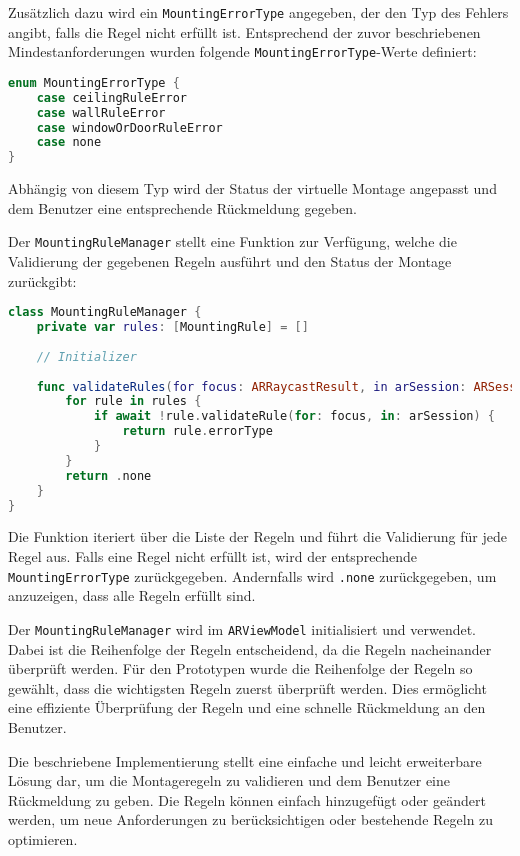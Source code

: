 Zusätzlich dazu wird ein \texttt{MountingErrorType} angegeben, der den Typ des Fehlers angibt, falls die Regel nicht erfüllt ist. Entsprechend der zuvor beschriebenen Mindestanforderungen wurden folgende \texttt{MountingErrorType}-Werte definiert:

\begin{lstlisting}[language=Swift]
enum MountingErrorType {
    case ceilingRuleError
    case wallRuleError
    case windowOrDoorRuleError
    case none
}
\end{lstlisting}

Abhängig von diesem Typ wird der Status der virtuelle Montage angepasst und dem Benutzer eine entsprechende Rückmeldung gegeben. 

Der \texttt{MountingRuleManager} stellt eine Funktion zur Verfügung, welche die Validierung der gegebenen Regeln ausführt und den Status der Montage zurückgibt:


\begin{lstlisting}[language=Swift]
class MountingRuleManager {
    private var rules: [MountingRule] = []
    
    // Initializer
    
    func validateRules(for focus: ARRaycastResult, in arSession: ARSession) async -> errorType: MountingErrorType {
        for rule in rules {
            if await !rule.validateRule(for: focus, in: arSession) {
                return rule.errorType
            }
        }
        return .none
    }
}
\end{lstlisting}

Die Funktion iteriert über die Liste der Regeln und führt die Validierung für jede Regel aus. Falls eine Regel nicht erfüllt ist, wird der entsprechende \texttt{MountingErrorType} zurückgegeben. Andernfalls wird \texttt{.none} zurückgegeben, um anzuzeigen, dass alle Regeln erfüllt sind.

Der \texttt{MountingRuleManager} wird im \texttt{ARViewModel} initialisiert und verwendet. Dabei ist die Reihenfolge der Regeln entscheidend, da die Regeln nacheinander überprüft werden. Für den Prototypen wurde die Reihenfolge der Regeln so gewählt, dass die wichtigsten Regeln zuerst überprüft werden. Dies ermöglicht eine effiziente Überprüfung der Regeln und eine schnelle Rückmeldung an den Benutzer.

Die beschriebene Implementierung stellt eine einfache und leicht erweiterbare Lösung dar, um die Montageregeln zu validieren und dem Benutzer eine Rückmeldung zu geben. Die Regeln können einfach hinzugefügt oder geändert werden, um neue Anforderungen zu berücksichtigen oder bestehende Regeln zu optimieren.

